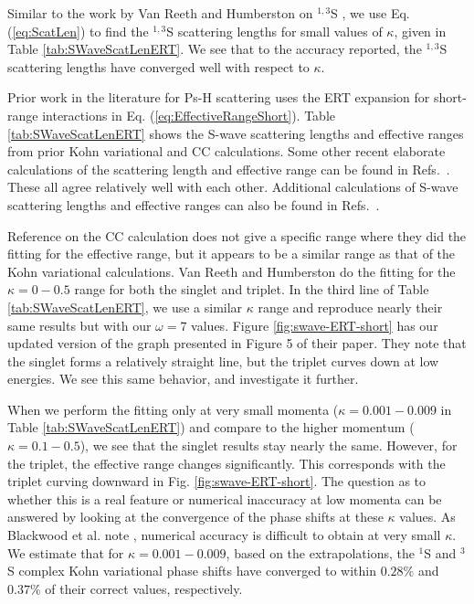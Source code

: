\documentclass[preprint,showpacs,preprintnumbers,amsmath,amssymb,longbibliography,pra,aps]{revtex4-1}
\begin{document}
Similar to the work by Van Reeth and Humberston on $^{1,3}$S \cite{VanReeth2003}, we use Eq. (\ref{eq:ScatLen}) to find the $^{1,3}$S scattering lengths for small values of $\kappa$, given in Table \ref{tab:SWaveScatLenERT}. We see that to the accuracy reported, the $^{1,3}$S scattering lengths have converged well with respect to $\kappa$.

Prior work in the literature for Ps-H scattering \cite{Blackwood2002,Ivanov2002,Walters2004,VanReeth2003} uses the ERT expansion for short-range interactions in Eq. (\ref{eq:EffectiveRangeShort}). Table \ref{tab:SWaveScatLenERT} shows the S-wave scattering lengths and effective ranges from prior Kohn variational \cite{VanReeth2003} and CC \cite{Blackwood2002,Walters2004} calculations. Some other recent elaborate calculations of the scattering length and effective range can be found in Refs.~\cite{Sinha2000,Ivanov2001,Chiesa2002,Ivanov2002}. These all agree relatively well with each other. Additional calculations of S-wave scattering lengths and effective ranges can also be found in Refs.~\cite{Hara1975,Page1976,Drachman1975,Drachman1976,Campbell1998,Adhikari1999,Adhikari2001b}.

Reference \cite{Blackwood2002} on the CC calculation does not give a specific range where they did the fitting for the effective range, but it appears to be a similar range as that of the Kohn variational calculations. Van Reeth and Humberston \cite{VanReeth2003} do the fitting for the $\kappa = 0-0.5$ range for both the singlet and triplet. In the third line of Table \ref{tab:SWaveScatLenERT}, we use a similar $\kappa$ range and reproduce nearly their same results but with our $\omega = 7$ values. Figure \ref{fig:swave-ERT-short} has our updated version of the graph presented in Figure 5 of their paper. They note that the singlet forms a relatively straight line, but the triplet curves down at low energies. We see this same behavior, and investigate it further.

When we perform the fitting only at very small momenta ($\kappa = 0.001 - 0.009$ in Table \ref{tab:SWaveScatLenERT}) and compare to the higher momentum ($\kappa = 0.1 - 0.5$), we see that the singlet results stay nearly the same. However, for the triplet, the effective range changes significantly. This corresponds with the triplet curving downward in Fig. \ref{fig:swave-ERT-short}. The question as to whether this is a real feature or numerical inaccuracy at low momenta can be answered by looking at the convergence of the phase shifts at these $\kappa$ values. As Blackwood et al. note \cite{Blackwood2002}, numerical accuracy is difficult to obtain at very small $\kappa$. We estimate that for $\kappa = 0.001 - 0.009$, based on the extrapolations, the $^1$S and $^3$S complex Kohn variational phase shifts have converged to within $0.28\%$ and $0.37\%$ of their correct values, respectively.
\end{document}
